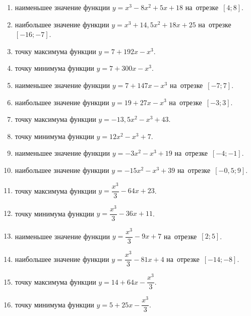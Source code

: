 \documentclass[a4paper,10pt]{article}
\begin{document}
\begin{enumerate}
\item {} наименьшее значение функции $y=x^3 -8x^2+5x+18$ на~отрезке~$\left[4;8\right]$.

\item {} наибольшее значение функции $y=x^3 +14,5x^2+18x+25$ на~отрезке~$\left[-16;-7\right]$.

\item {} точку максимума функции $y=7+192x-x^3$.

\item {} точку минимума функции $y=7+300x-x^3$.

\item {} наименьшее значение функции $y=7+147x-x^3$ на~отрезке~$\left[-7;7\right]$.

\item {} наибольшее значение функции $y=19+27x-x^3$ на~отрезке~$\left[-3;3\right]$.

\item {} точку максимума функции $y=-13,5x^2-x^3+43$.

\item {} точку минимума функции $y=12x^2-x^3+7$.

\item {} наименьшее значение функции $y=-3x^2-x^3+19$ на~отрезке~$\left[-4;-1\right]$.

\item {} наибольшее значение функции $y=-15x^2-x^3+39$ на~отрезке~$\left[-0,5;9\right]$.

\item {} точку максимума функции $y=\dfrac{x^3}{3} -64x+23$.

\item {} точку минимума функции $y=\dfrac{x^3}{3} -36x+11$.

\item {} наименьшее значение функции $y=\dfrac{x^3}{3} -9x+7$ на~отрезке~$\left[2;5\right]$.

\item {} наибольшее значение функции $y=\dfrac{x^3}{3} -81x+4$ на~отрезке~$\left[-14;-8\right]$.

\item {} точку максимума функции $y=14 +64x-\dfrac{x^3}{3}$.

\item {} точку минимума функции $y=5 +25x-\dfrac{x^3}{3}$.


\end{enumerate}
\end{document}
